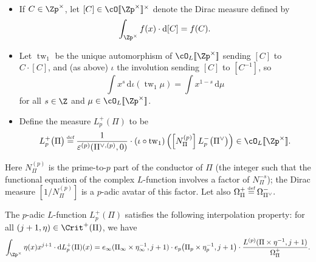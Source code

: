 \documentclass[10pt,reqno,a4paper]{amsart}
\begin{document}
 \begin{definition} \
 	\begin{itemize}
 		\item[(i)] If $C \in \Zp^\times$, let $[C] \in \cO[\![\Zp^\times]\!]^\times$ denote the Dirac measure defined by
 		\[
  	\int_{\Zp^\times} f(x) \cdot \mathrm{d}[C] = f(C).
 		\]
   \item[(ii)] Let $\operatorname{tw}_1$ be the unique automorphism of $\cO_L[\![\Zp^\times]\!]$ sending $[C]$ to $C \cdot [C]$, and (as above) $\iota$ the involution sending $[C]$ to $[C^{-1}]$, so 
   \[  \int x^s\, \mathrm{d}\iota(\operatorname{tw}_1 \mu) = \int x^{1-s}\, \mathrm{d}\mu
   \]
   for all $s \in \Z$ and $\mu \in \cO_L[\![\Zp^\times]\!]$.
   
   
 		\item[(iii)] Define the measure $L_p^+(\Pi)$ to be
 		\[
 		L_p^+\big(\Pi\big) \defeq \frac{1}{\varepsilon^{(p)}(\Pi^{\vee,(p)}, 0)} \cdot (\iota \circ \operatorname{tw}_1) \left(\left[N_{\Pi}^{(p)}\right] L_p^-\big( \Pi^\vee \big)\right) \in \cO_L[\![\Zp^\times]\!].
 		\]
 	\end{itemize}
 \end{definition}

 Here $N_\Pi^{(p)}$ is the prime-to-$p$ part of the conductor of $\Pi$ (the integer such that the functional equation of the complex $L$-function involves a factor of $N_{\Pi}^{-s}$); the Dirac measure $[1/N_\Pi^{(p)}]$ is a $p$-adic avatar of this factor.
 Let also $\Omega_\Pi^+ \defeq \Omega_{\Pi^\vee}^-.$

 \begin{proposition}
 The $p$-adic $L$-function $L_p^+(\Pi)$ satisfies the following interpolation property: for all $(j+1,\eta) \in \Crit^+(\Pi)$, we have
 \begin{equation}\label{eq:interpolation final +}
 	\int_{\Zp^\times} \eta(x)x^{j+1} \cdot \mathrm{d}L_p^+(\Pi)(x) = e_\infty(\Pi_\infty \times \eta_\infty^{-1},j+1)\cdot e_p\big(\Pi_p \times \eta_p^{-1}, j+1\big)\cdot \frac{L^{(p)}(\Pi\times\eta^{-1},j+1)}{\Omega_\Pi^+}.
 \end{equation}
 \end{proposition}
\end{document}
